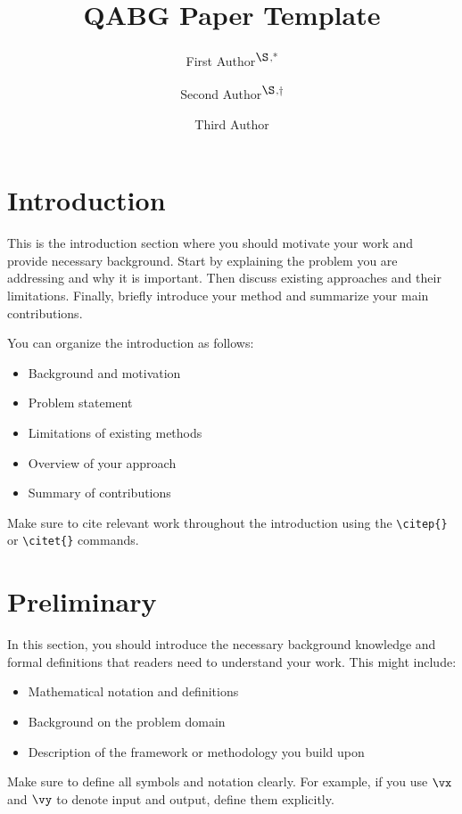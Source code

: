 \documentclass[10pt, a4paper, logo]{googledeepmind}
\title{QABG Paper Template}
\author[1]{First Author\textsuperscript{$\S$,*}}
\author[2]{Second Author\textsuperscript{$\S$,$\dag$}}
\author[2]{Third Author}
\affil[1]{xxx University}
\affil[2]{Qwen Large Model Application Team, Alibaba}
\begin{document}
\maketitle
\section{Introduction}
\label{sec:introduction}

This is the introduction section where you should motivate your work and provide necessary background. Start by explaining the problem you are addressing and why it is important. Then discuss existing approaches and their limitations. Finally, briefly introduce your method and summarize your main contributions.

You can organize the introduction as follows:
\begin{itemize}
    \item Background and motivation
    \item Problem statement
    \item Limitations of existing methods
    \item Overview of your approach
    \item Summary of contributions
\end{itemize}

Make sure to cite relevant work throughout the introduction using the \texttt{\textbackslash citep\{\}} or \texttt{\textbackslash citet\{\}} commands.


\section{Preliminary}
\label{sec:preliminary}

In this section, you should introduce the necessary background knowledge and formal definitions that readers need to understand your work. This might include:

\begin{itemize}
    \item Mathematical notation and definitions
    \item Background on the problem domain
    \item Description of the framework or methodology you build upon
\end{itemize}

Make sure to define all symbols and notation clearly. For example, if you use $\vx$ and $\vy$ to denote input and output, define them explicitly.
\end{document}
